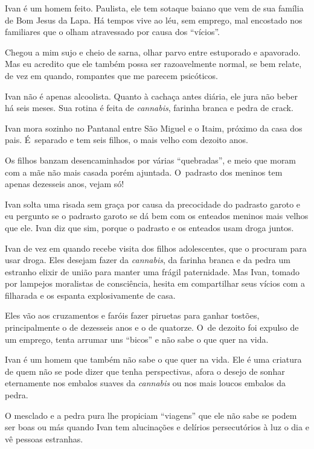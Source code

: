  

Ivan é um homem feito. Paulista, ele tem sotaque baiano que vem de sua
família de Bom Jesus da Lapa. Há tempos vive ao léu, sem emprego, mal
encostado nos familiares que o olham atravessado por causa dos
``vícios''.

Chegou a mim sujo e cheio de sarna, olhar parvo entre estuporado e
apavorado. Mas eu acredito que ele também possa ser razoavelmente
normal, se bem relate, de vez em quando, rompantes que me parecem
psicóticos.

Ivan não é apenas alcoolista. Quanto à cachaça antes diária, ele jura
não beber há seis meses. Sua rotina é feita de \emph{cannabis}, farinha
branca e pedra de crack.

\asterisc{}

Ivan mora sozinho no Pantanal entre São Miguel e o Itaim, próximo da
casa dos pais. É~separado e tem seis filhos, o mais velho com dezoito
anos.

Os filhos banzam desencaminhados por várias ``quebradas'', e meio que
moram com a mãe não mais casada porém ajuntada. O~padrasto dos meninos
tem apenas dezesseis anos, vejam só!

Ivan solta uma risada sem graça por causa da precocidade do padrasto
garoto e eu pergunto se o padrasto garoto se dá bem com os enteados
meninos mais velhos que ele. Ivan diz que sim, porque o padrasto e os
enteados usam droga juntos.

\asterisc{}

Ivan de vez em quando recebe visita dos filhos adolescentes, que o
procuram para usar droga. Eles desejam fazer da \emph{cannabis}, da
farinha branca e da pedra um estranho elixir de união para manter uma
frágil paternidade. Mas Ivan, tomado por lampejos moralistas de
consciência, hesita em compartilhar seus vícios com a filharada e os
espanta explosivamente de casa.

Eles vão aos cruzamentos e faróis fazer piruetas para ganhar tostões,
principalmente o de dezesseis anos e o de quatorze. O~de dezoito foi
expulso de um emprego, tenta arrumar uns ``bicos'' e não sabe o que quer
na vida.

\asterisc{}

Ivan é um homem que também não sabe o que quer na vida. Ele é uma
criatura de quem não se pode dizer que tenha perspectivas, afora o
desejo de sonhar eternamente nos embalos suaves da \emph{cannabis} ou
nos mais loucos embalos da pedra.

O mesclado e a pedra pura lhe propiciam ``viagens'' que ele não sabe se
podem ser boas ou más quando Ivan tem alucinações e delírios
persecutórios à luz o dia e vê pessoas estranhas.

